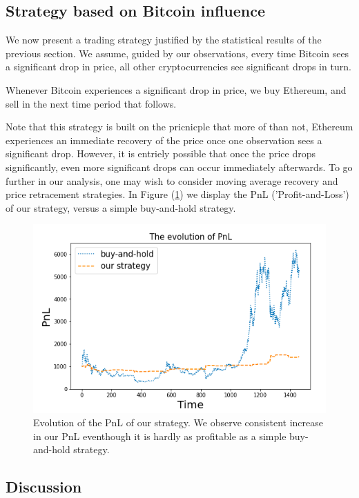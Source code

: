 \documentclass[twoside]{report}
\begin{document}
\begin{spacing}{1}
\subsection{Strategy based on Bitcoin influence}

We now present a trading strategy justified by the statistical results of the previous section. We assume, guided by our observations, every time Bitcoin sees a significant drop in price, all other cryptocurrencies see significant drops in turn. \begin{strategy}
Whenever Bitcoin experiences a significant drop in price, we buy Ethereum, and sell in the next time period that follows.
\end{strategy} 
Note that this strategy is built on the pricnicple that more of than not,  Ethereum experiences an immediate recovery of the price once one observation sees a significant drop. However, it is entriely possible that once the price drops significantly, even more significant drops can occur immediately afterwards. To go further in our analysis, one may wish to consider moving average recovery and price retracement strategies. In Figure (\ref{fig:backtested_strategy_2}) we display the PnL ('Profit-and-Loss') of our strategy, versus a simple buy-and-hold strategy. 

\begin{figure}[!htbp]
    \centering
    \includegraphics[width=0.8\linewidth]{Causality_between_time_series/backtested_strategy_2.png}
    \caption{Evolution of the PnL of our strategy. We observe consistent increase in our PnL eventhough it is hardly as profitable as a simple buy-and-hold strategy.}
    \label{fig:backtested_strategy_2}
\end{figure}

\subsection{Discussion}


\end{spacing}
\end{document}
